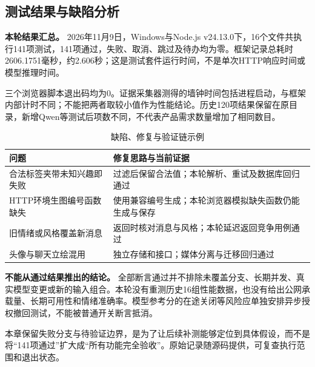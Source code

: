\clearpage
\subsection{测试结果与缺陷分析}
\label{sec:impl-19-results}
\par\medskip\noindent\textbf{本轮结果汇总。}
2026年11月9日，Windows与Node.js v24.13.0下，16个文件共执行141项测试，141项通过，失败、取消、跳过及待办均为零。框架记录总耗时2606.1751毫秒，约2.606秒；这是测试套件运行时间，不是单次HTTP响应时间或模型推理时间。

三个浏览器脚本退出码均为0。证据采集器测得的墙钟时间包括进程启动，与框架内部计时不同；不能把两者取较小值作为性能结论。历史120项结果保留在原目录，新增Qwen等测试后项数不同，不代表产品需求数量增加了相同数目。

\begin{table}[H]\centering\small
\caption{缺陷、修复与验证链示例}
\begin{tabularx}{\linewidth}{@{}p{33mm}X@{}}\toprule
问题 & 修复思路与当前证据 \\ \midrule
合法标签夹带未知兴趣即失败 & 过滤后保留合法值；本轮解析、重试及数据库回归通过 \\
HTTP环境生图编号函数缺失 & 使用兼容编号生成；本轮浏览器模拟缺失函数仍能生成与保存 \\
旧情绪或风格覆盖新消息 & 返回时核对消息与风格；本轮延迟返回竞争用例通过 \\
头像与聊天立绘混用 & 独立存储和接口；媒体分离与迁移回归通过 \\ \bottomrule
\end{tabularx}\end{table}

\par\medskip\noindent\textbf{不能从通过结果推出的结论。}
全部断言通过并不排除未覆盖分支、长期并发、真实模型变更或新的输入组合。本轮没有重测历史16组性能数据，也没有给出公网承载量、长期可用性和情绪准确率。模型参考分的在途关闭等风险应单独安排异步授权撤回测试，不能被普通开关断言抵消。

本章保留失败分支与待验证边界，是为了让后续补测能够定位到具体假设，而不是将“141项通过”扩大成“所有功能完全验收”。原始记录随源码提供，可复查执行范围和退出状态。
